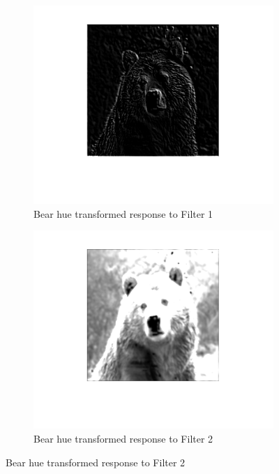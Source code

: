 \documentclass[a4paper]{iacas}
\begin{document}
\begin{figure}
  \begin{subfigure}{0.4\linewidth}
	\includegraphics[width=\linewidth]{imgs/bear_hued_filtered_1.png}
	\caption{Bear hue transformed response to Filter 1}
  \end{subfigure}
  \begin{subfigure}{0.4\linewidth}
	\includegraphics[width=\linewidth]{imgs/bear_hued_filtered_2.png}
	\caption{Bear hue transformed response to Filter 2}
  \end{subfigure}


\end{figure}
\end{document}
